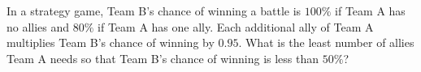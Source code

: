 In a strategy game, Team B's chance of winning a battle is $100\%$ if Team A has no allies and $80\%$ if Team A has one ally. Each additional ally of Team A multiplies Team B's chance of winning by $0.95$. What is the least number of allies Team A needs so that Team B's chance of winning is less than $50\%$?
